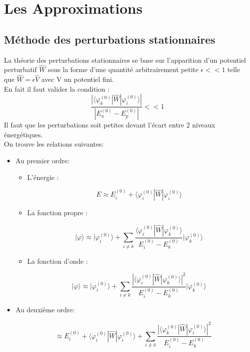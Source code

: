 \chapter{Les Approximations}



\section{Méthode des perturbations stationnaires}


La théorie des perturbations stationnaires se base sur l'apparition d'un potentiel perturbatif $\hat{W}$ sous la forme d'une quantité arbitrairement petite $\epsilon <<1$ telle que $\hat{W}=\epsilon\hat{V}$ avec V un potentiel fini.\\
En fait il faut valider la condition :
$$\frac{|\langle \varphi_k^{(0)} | \hat{W} |\varphi_i^{(0)} \rangle|}{|E_n^{(0)}-E_p^{(0)}|}<<1$$
Il faut que les perturbations soit petites devant l'écart entre 2 niveaux énergétiques.\\

On trouve les relations suivantes:

\begin{itemize}[label=]

	\item Au premier ordre:

	\begin{itemize}[label=]

		\item L'énergie : 

		\[
			E \approx E_i^{(0)} + \langle \varphi_i^{(0)} | \hat{W} |\varphi_i^{(0)} \rangle
		\]

		\item La fonction propre :

		\[
		 | \varphi \rangle \approx
		| \varphi_i^{(0)} \rangle +
		\sum_{i\neq k}\frac{\langle \varphi_i^{(0)} | \hat{W} |\varphi_k^{(0)} \rangle}{E_i^{(0)}-E_k^{(0)}}
		| \varphi_k^{(0)}\rangle 
		\]

		\item La fonction d'onde :

		\[
		 | \varphi \rangle \approx
		| \varphi_i^{(0)} \rangle +
		\sum_{i\neq k}\frac{|\langle \varphi_i^{(0)} | \hat{W} |\varphi_k^{(0)} \rangle|^2}{E_i^{(0)}-E_k^{(0)}}
		| \varphi_k^{(0)}\rangle
		\] 

	\end{itemize}

	\item Au deuxième ordre:

	\[
		\approx E_i^{(0)} + \langle \varphi_i^{(0)} | \hat{W} |\varphi_i^{(0)} \rangle +\sum_{i\neq k}\frac{|\langle \varphi_k^{(0)} | \hat{W} |\varphi_i^{(0)} \rangle|^2}{E_i^{(0)}-E_k^{(0)}}
	\]

\end{itemize}


